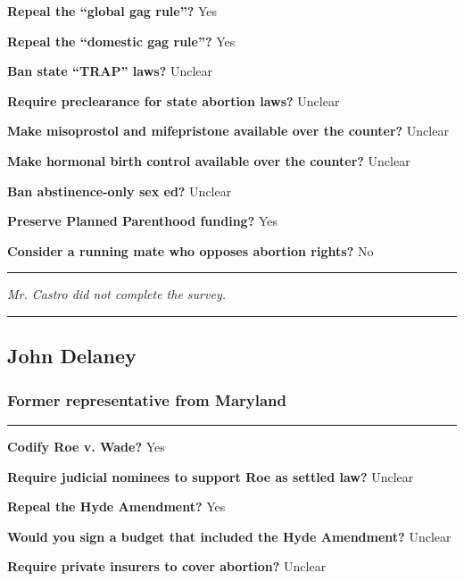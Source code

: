 \textbf{Repeal the ``global gag rule''?} Yes

\textbf{Repeal the ``domestic gag rule''?} Yes

\textbf{Ban state ``TRAP'' laws?} Unclear

\textbf{Require preclearance for state abortion laws?} Unclear

\textbf{Make misoprostol and mifepristone available over the counter?}
Unclear

\textbf{Make hormonal birth control available over the counter?} Unclear

\textbf{Ban abstinence-only sex ed?} Unclear

\textbf{Preserve Planned Parenthood funding?} Yes

\textbf{Consider a running mate who opposes abortion rights?} No

\begin{center}\rule{0.5\linewidth}{\linethickness}\end{center}

\emph{Mr. Castro did not complete the survey.}

\begin{center}\rule{0.5\linewidth}{\linethickness}\end{center}

\hypertarget{john-delaney}{%
\subsection{John Delaney}\label{john-delaney}}

\hypertarget{former-representative-from-maryland}{%
\subsubsection{Former representative from
Maryland}\label{former-representative-from-maryland}}

\begin{center}\rule{0.5\linewidth}{\linethickness}\end{center}

\textbf{Codify Roe v. Wade?} Yes

\textbf{Require judicial nominees to support Roe as settled law?}
Unclear

\textbf{Repeal the Hyde Amendment?} Yes

\textbf{Would you sign a budget that included the Hyde Amendment?}
Unclear

\textbf{Require private insurers to cover abortion?} Unclear

